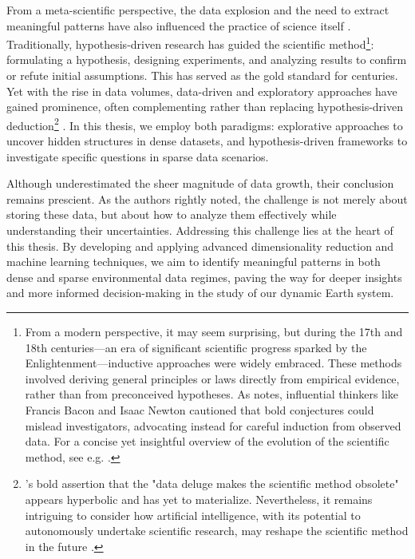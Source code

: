 From a meta-scientific perspective, the data explosion and the need to extract meaningful patterns have also influenced the practice of science itself \cite{voit_perspective_2019}. Traditionally, hypothesis-driven research has guided the scientific method\footnote{From a modern perspective, it may seem surprising, but during the 17th and 18th centuries---an era of significant scientific progress sparked by the Enlightenment---inductive approaches were widely embraced. These methods involved deriving general principles or laws directly from empirical evidence, rather than from preconceived hypotheses. As \citet{elliott_conceptions_2016} notes, influential thinkers like Francis Bacon and Isaac Newton cautioned that bold conjectures could mislead investigators, advocating instead for careful induction from observed data. For a concise yet insightful overview of the evolution of the scientific method, see e.g. \citet{voit_perspective_2019}.}: formulating a hypothesis, designing experiments, and analyzing results to confirm or refute initial assumptions. This has served as the gold standard for centuries. Yet with the rise in data volumes, data-driven and exploratory approaches have gained prominence, often complementing rather than replacing hypothesis-driven deduction\footnote{\citet{anderson_end_2008}'s bold assertion that the "data deluge makes the scientific method obsolete" appears hyperbolic and has yet to materialize. Nevertheless, it remains intriguing to consider how artificial intelligence, with its potential to autonomously undertake scientific research, may reshape the scientific method in the future \cite{li_paradigm_2024,swanson_virtual_2024}.} \cite{kell_here_2004,glass_critique_2010,voit_perspective_2019}. In this thesis, we employ both paradigms: explorative approaches to uncover hidden structures in dense datasets, and hypothesis-driven frameworks to investigate specific questions in sparse data scenarios.

Although \citet{overpeck_climate_2011} underestimated the sheer magnitude of data growth, their conclusion remains prescient. As the authors rightly noted, the challenge is not merely about storing these data, but about how to analyze them effectively while understanding their uncertainties. Addressing this challenge lies at the heart of this thesis. By developing and applying advanced dimensionality reduction and machine learning techniques, we aim to identify meaningful patterns in both dense and sparse environmental data regimes, paving the way for deeper insights and more informed decision-making in the study of our dynamic Earth system.



\clearpage
